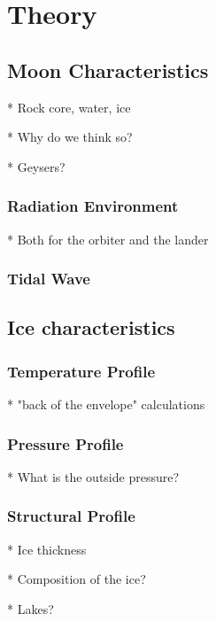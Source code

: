 \section{Theory}


\subsection{Moon Characteristics} %

* Rock core, water, ice

    * Why do we think so?
    
    * Geysers?
    
\subsubsection{Radiation Environment} %

* Both for the orbiter and the lander

\subsubsection{Tidal Wave} %

\subsection{Ice characteristics} %

\subsubsection{Temperature Profile}

* "back of the envelope" calculations

\subsubsection{Pressure Profile}

* What is the outside pressure?

\subsubsection{Structural Profile}

* Ice thickness

* Composition of the ice? %

* Lakes?

